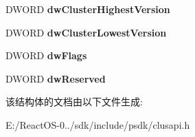\begin{DoxyCompactItemize}
D\+W\+O\+RD {\bfseries dw\+Cluster\+Highest\+Version}
\item 
\mbox{\label{struct___c_l_u_s_t_e_r_v_e_r_s_i_o_n_i_n_f_o_a0c48bad5a4f15deac3f6a75b5c707d66}} 
D\+W\+O\+RD {\bfseries dw\+Cluster\+Lowest\+Version}
\item 
\mbox{\label{struct___c_l_u_s_t_e_r_v_e_r_s_i_o_n_i_n_f_o_a1395bdf420bd0abd60f416f144b4ec5a}} 
D\+W\+O\+RD {\bfseries dw\+Flags}
\item 
\mbox{\label{struct___c_l_u_s_t_e_r_v_e_r_s_i_o_n_i_n_f_o_a2172b5d85910964311d2ee38f30e68df}} 
D\+W\+O\+RD {\bfseries dw\+Reserved}
\end{DoxyCompactItemize}


该结构体的文档由以下文件生成\+:\begin{DoxyCompactItemize}
\item 
E\+:/\+React\+O\+S-\/0../sdk/include/psdk/clusapi.\+h\end{DoxyCompactItemize}
